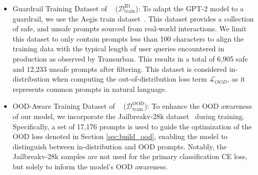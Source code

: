 \begin{itemize}
    \item Guardrail Training Dataset of \ourapp~ ($\mathcal{D}_{\text{train}}^{\text{ID}}$): 
    To adapt the GPT-2 model to a guardrail, we use the Aegis train dataset~\cite{ghosh2025aegis2}. This dataset provides a collection of safe, and unsafe prompts sourced from real-world interactions. We limit this dataset to only contain prompts less than 100 characters to align the training data with the typical length of user queries encountered in production as observed by Transurban. This results in a total of 6,905 safe and 12,233 unsafe prompts after filtering. This dataset is considered in-distribution when computing the out-of-distribution loss term $\mathcal{L}_{OOD}$, as it represents common prompts in natural language.
    
    \item OOD-Aware Training Dataset of \ourapp~ ($\mathcal{D}_{\text{train}}^{\text{OOD}}$): 
    To enhance the OOD awareness of our model, we incorporate the Jailbreakv-28k dataset~\cite{luo2024jailbreakv} during training. Specifically, a set of 17,176 prompts is used to guide the optimization of the OOD loss denoted in Section \ref{sec:build_ood}, enabling the model to distinguish between in-distribution and OOD prompts. Notably, the Jailbreakv-28k samples are not used for the primary classification CE loss, but solely to inform the model’s OOD awareness.
    

\end{itemize}
